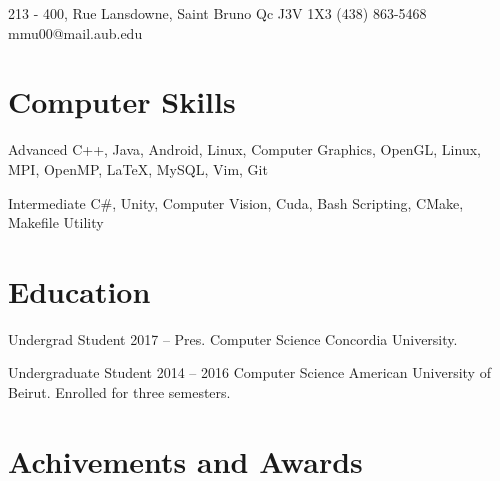\documentclass{tccv}
\begin{document}
\personal
    {213 - 400,  Rue Lansdowne, Saint Bruno \hspace{1cm} Qc J3V 1X3}
    {(438) 863-5468}
    {mmu00@mail.aub.edu}
    
\section{Computer Skills}

\begin{factlist}

\item{Advanced}
     {C++, Java, Android, Linux, Computer Graphics, OpenGL, Linux, MPI, OpenMP, \LaTeX, MySQL, Vim, Git}


\item{Intermediate}
     {C\#, Unity, Computer Vision,  Cuda, Bash Scripting, CMake, Makefile Utility}

\end{factlist}    
    

\section{Education}

\begin{yearlist}

\item[Undergrad Student]{2017 -- Pres.}
     {Computer Science } 
     {Concordia University.}

\item[Undergraduate Student]{2014 -- 2016}
     {Computer Science} 
     {American University of Beirut. Enrolled for three semesters.}



\end{yearlist}



\section{Achivements and Awards}
\end{document}
